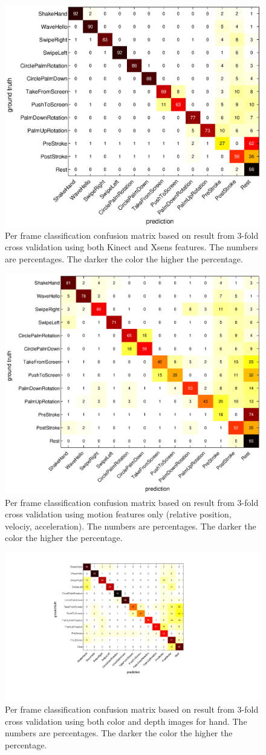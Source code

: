 \begin{figure}[h]
\centering
\includegraphics[trim={6cm 3.5cm 10cm 1.5cm}, clip,
width=0.5\columnwidth]{figures/confusion-matrix.eps} \caption{Per frame
classification confusion matrix based on result from 3-fold cross validation using both Kinect and Xsens features. The numbers are percentages. The darker the color the higher the percentage.}
\label{fig:confusion}
\end{figure}

\begin{figure}[h]
\centering
\includegraphics[trim={6cm 3.5cm 10cm 1.5cm}, clip,
width=0.6\columnwidth]{figures/confusion_motion.eps} \caption{Per frame
classification confusion matrix based on result from 3-fold cross validation
using motion features only (relative position, velociy, acceleration). The
numbers are percentages.
The darker the color the higher the percentage.}
\label{fig:confusion}
\end{figure}

\begin{figure}[tb]
\centering
\includegraphics[trim={6cm 3.5cm 10cm 1.5cm}, clip,
width=0.6\columnwidth]{figures/confusion_color_depth.png} \caption{Per frame
classification confusion matrix based on result from 3-fold cross validation using 
both color and depth images for hand. The numbers are percentages. The darker
the color the higher the percentage.}
\label{fig:confusion}
\end{figure}

